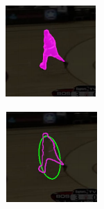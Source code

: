 \begin{figure}[t]
    \centering
    \begin{subfigure}[b]{0.135\textwidth}
        \centering
        \includegraphics[width=\textwidth]{figures/theoretical_foundations/fast_vot_rot_bbox_algo_01.pdf}
        \caption[]{}
    \end{subfigure}
    \hfill
    \begin{subfigure}[b]{0.135\textwidth}
        \centering
        \includegraphics[width=\textwidth]{figures/theoretical_foundations/fast_vot_rot_bbox_algo_02.pdf}

\end{subfigure}
\end{figure}
